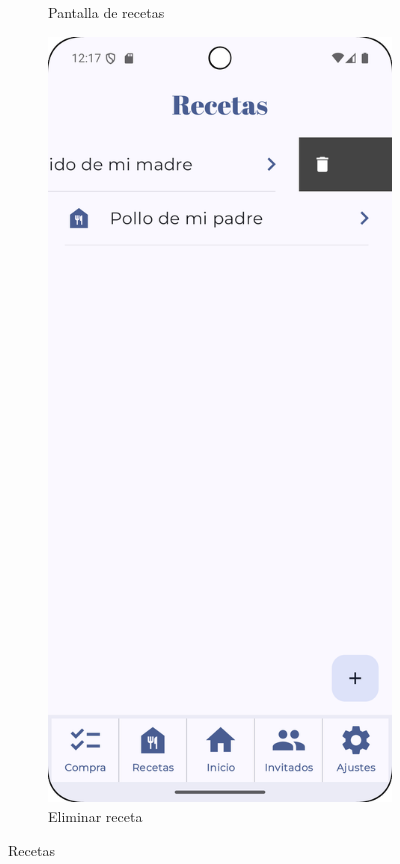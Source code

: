 \begin{figure}[H]
\begin{subfigure}[b]{0.3\textwidth}
      \caption{Pantalla de recetas}
      \label{fig:recipes-not-empty}
    \end{subfigure}
    \hfill
    \begin{subfigure}[b]{0.3\textwidth}
      \includegraphics[width=\textwidth]{./img/manual/delete_recipe.png}
      \caption{Eliminar receta}
      \label{fig:delete-recipes}
    \end{subfigure}

    \caption{Recetas}
    \label{fig:recipes}
\end{figure}

